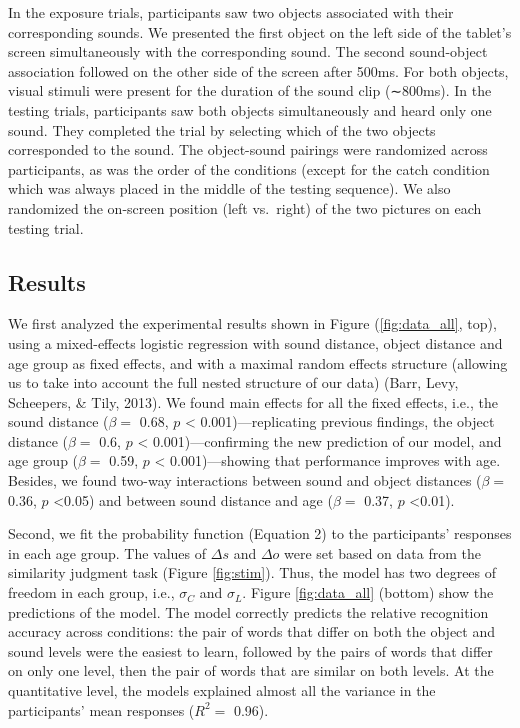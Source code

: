 \documentclass[10pt, letterpaper]{article}
\begin{document}
In the exposure trials, participants saw two objects associated with
their corresponding sounds. We presented the first object on the left
side of the tablet's screen simultaneously with the corresponding sound.
The second sound-object association followed on the other side of the
screen after 500ms. For both objects, visual stimuli were present for
the duration of the sound clip (∼800ms). In the testing trials,
participants saw both objects simultaneously and heard only one sound.
They completed the trial by selecting which of the two objects
corresponded to the sound. The object-sound pairings were randomized
across participants, as was the order of the conditions (except for the
catch condition which was always placed in the middle of the testing
sequence). We also randomized the on-screen position (left vs.~right) of
the two pictures on each testing trial.

\subsection{Results}\label{results}

We first analyzed the experimental results shown in Figure
(\ref{fig:data_all}, top), using a mixed-effects logistic regression
with sound distance, object distance and age group as fixed effects, and
with a maximal random effects structure (allowing us to take into
account the full nested structure of our data) (Barr, Levy, Scheepers,
\& Tily, 2013). We found main effects for all the fixed effects, i.e.,
the sound distance (\(\beta =\) 0.68, \(p\) \textless{}
0.001)---replicating previous findings, the object distance (\(\beta =\)
0.6, \(p\) \textless{} 0.001)---confirming the new prediction of our
model, and age group (\(\beta =\) 0.59, \(p\) \textless{}
0.001)---showing that performance improves with age. Besides, we found
two-way interactions between sound and object distances (\(\beta =\)
0.36, \(p\) \textless{}0.05) and between sound distance and age
(\(\beta =\) 0.37, \(p\) \textless{}0.01).

Second, we fit the probability function (Equation 2) to the
participants' responses in each age group. The values of \(\Delta s\)
and \(\Delta o\) were set based on data from the similarity judgment
task (Figure \ref{fig:stim}). Thus, the model has two degrees of freedom
in each group, i.e., \(\sigma_C\) and \(\sigma_L\). Figure
\ref{fig:data_all} (bottom) show the predictions of the model. The model
correctly predicts the relative recognition accuracy across conditions:
the pair of words that differ on both the object and sound levels were
the easiest to learn, followed by the pairs of words that differ on only
one level, then the pair of words that are similar on both levels. At
the quantitative level, the models explained almost all the variance in
the participants' mean responses (\(R^2=\) 0.96).
\end{document}
